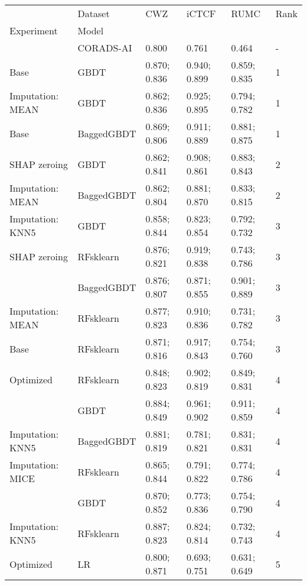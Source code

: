 \begin{tabular}{llllll}
\toprule
                       & Dataset &            CWZ &          iCTCF &           RUMC & Rank \\
Experiment & Model &                &                &                &      \\
\midrule
                       & CORADS-AI &          0.800 &          0.761 &          0.464 &    - \\
Base & GBDT &  0.870;  0.836 &  0.940;  0.899 &  0.859;  0.835 &    1 \\
Imputation: MEAN & GBDT &  0.862;  0.836 &  0.925;  0.895 &  0.794;  0.782 &    1 \\
Base & BaggedGBDT &  0.869;  0.806 &  0.911;  0.889 &  0.881;  0.875 &    1 \\
SHAP zeroing & GBDT &  0.862;  0.841 &  0.908;  0.861 &  0.883;  0.843 &    2 \\
Imputation: MEAN & BaggedGBDT &  0.862;  0.804 &  0.881;  0.870 &  0.833;  0.815 &    2 \\
Imputation: KNN5 & GBDT &  0.858;  0.844 &  0.823;  0.854 &  0.792;  0.732 &    3 \\
SHAP zeroing & RFsklearn &  0.876;  0.821 &  0.919;  0.838 &  0.743;  0.786 &    3 \\
                       & BaggedGBDT &  0.876;  0.807 &  0.871;  0.855 &  0.901;  0.889 &    3 \\
Imputation: MEAN & RFsklearn &  0.877;  0.823 &  0.910;  0.836 &  0.731;  0.782 &    3 \\
Base & RFsklearn &  0.871;  0.816 &  0.917;  0.843 &  0.754;  0.760 &    3 \\
Optimized & RFsklearn &  0.848;  0.823 &  0.902;  0.819 &  0.849;  0.831 &    4 \\
                       & GBDT &  0.884;  0.849 &  0.961;  0.902 &  0.911;  0.859 &    4 \\
Imputation: KNN5 & BaggedGBDT &  0.881;  0.819 &  0.781;  0.821 &  0.831;  0.831 &    4 \\
Imputation: MICE & RFsklearn &  0.865;  0.844 &  0.791;  0.822 &  0.774;  0.786 &    4 \\
                       & GBDT &  0.870;  0.852 &  0.773;  0.836 &  0.754;  0.790 &    4 \\
Imputation: KNN5 & RFsklearn &  0.887;  0.823 &  0.824;  0.814 &  0.732;  0.743 &    4 \\
Optimized & LR &  0.800;  0.871 &  0.693;  0.751 &  0.631;  0.649 &    5 \\

\end{tabular}
